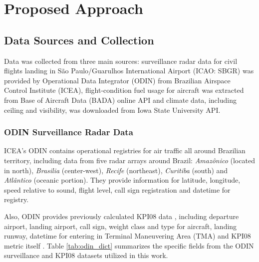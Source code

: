 \section{Proposed Approach}
\label{sec:proposed_approach}

\subsection{Data Sources and Collection}
Data was collected from three main sources: surveillance radar data for civil flights landing in São Paulo/Guarulhos International Airport (ICAO: SBGR) was provided by Operational Data Integrator (ODIN) from Brazilian Airspace Control Institute (ICEA), flight-condition fuel usage for aircraft was extracted from Base of Aircraft Data (BADA) online API \cite{bada_a320} and climate data, including ceiling and visibility, was downloaded from Iowa State University API.

\subsubsection{ODIN Surveillance Radar Data}
ICEA's ODIN contains operational registries for air traffic all around Brazilian territory, including data from five radar arrays around Brazil: \textit{Amazônico} (located in north), \textit{Brasilia} (center-west), \textit{Recife} (northeast), \textit{Curitiba} (south) and \textit{Atlântico} (oceanic portion). They provide information for latitude, longitude, speed relative to sound, flight level, call sign registration and datetime for registry.

Also, ODIN provides previously calculated KPI08 data \cite{mca10022}, including departure airport, landing airport, call sign, weight class and type for aircraft, landing runway, datetime for entering in Terminal Maneuvering Area (TMA) and KPI08 metric itself \cite{doc9750}. Table \ref{tab:odin_dict} summarizes the specific fields from the ODIN surveillance and KPI08 datasets utilized in this work.

